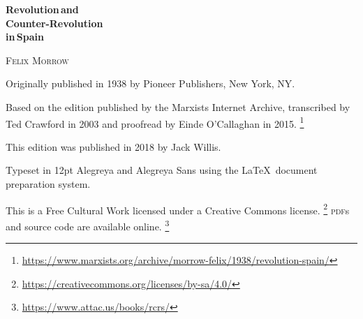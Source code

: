 \begin{titlepage}
	\setlength{\parindent}{0pt}
	
	\vspace*{\fill}
	
	{\sffamily\bfseries\fontsize{40}{40}\selectfont
		Revolution\,\textmd{and} \\
		Counter-Revolution \\
		\textmd{in}\,Spain
		\par}
	
	\vspace{60pt}
	
	{\fontsize{20}{20}\selectfont
		\textsc{Felix Morrow}
		\par}
	
	\vspace*{\fill}
	
\end{titlepage}

{
	\thispagestyle{empty}
	\setlength{\parindent}{0em}
	\setlength{\parskip}{0.5em}
	\sloppy
	
	\vspace*{\fill}
	\vspace*{\fill}
	
	Originally published in 1938 by Pioneer Publishers, New York, NY.
	
	Based on the edition published by the Marxists Internet Archive, transcribed by Ted Crawford in 2003 and proofread by Einde O’Cal\-la\-ghan in 2015.%
	\footnote{\href{https://www.marxists.org/archive/morrow-felix/1938/revolution-spain/}{https://www.marxists.org/archive/morrow-felix/1938/revolution-spain/}}
	
	This edition was published in 2018 by Jack Willis.
	
	Typeset in 12pt Alegreya and {\AlegreyaSans Alegreya Sans} using the \LaTeX\ document preparation system.
	
	This is a Free Cultural Work licensed under a Creative Commons license.%
	\footnote{\href{https://creativecommons.org/licenses/by-sa/4.0/}{https://creativecommons.org/licenses/by-sa/4.0/}}
	\textsc{pdf}s and source code are available online.%
	\footnote{\href{https://www.attac.us/books/rcrs/}{https://www.attac.us/books/rcrs/}}
	
	\vspace*{\fill}
}